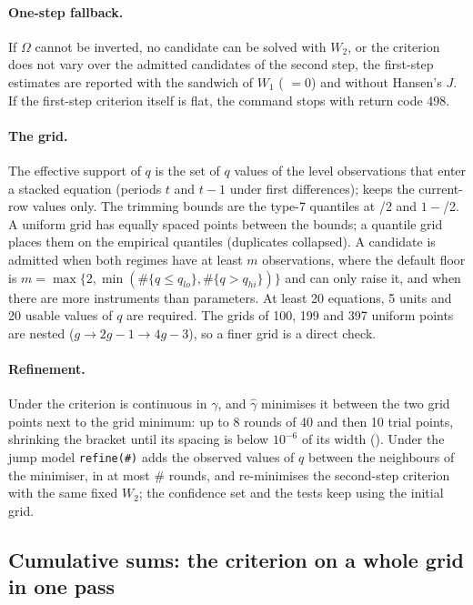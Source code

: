 \documentclass[
  10.5pt,
  a4paper,
]{article}
\begin{document}
\paragraph{One-step fallback.} If $\Omega$ cannot be inverted, no candidate can be solved with $W_2$,
or the criterion does not vary over the admitted candidates of the second step, the first-step
estimates are reported with the sandwich of $W_1$ ( $=0$) and without
Hansen's $J$. If the first-step criterion itself is flat, the command stops with return code 498.

\paragraph{The grid.} The effective support of $q$ is the set of $q$ values of the level observations
that enter a stacked equation (periods $t$ and $t-1$ under first differences); 
keeps the current-row values only. The trimming bounds are the type-7 quantiles at
/2 and $1-$/2. A uniform grid has equally spaced points between the bounds;
a quantile grid places them on the empirical quantiles (duplicates collapsed). A candidate is
admitted when both regimes have at least $m$ observations, where the default floor is
$m=\max\{2,\min(\#\{q\le q_{lo}\},\#\{q>q_{hi}\})\}$ and  can only raise it, and when
there are more instruments than parameters. At least 20 equations, 5 units and 20 usable values of
$q$ are required. The grids of 100, 199 and 397 uniform points are nested ($g\to2g-1\to4g-3$), so
a finer grid is a direct check.

\paragraph{Refinement.} Under  the criterion is continuous in $\gamma$, and $\hat\gamma$
minimises it between the two grid points next to the grid minimum: up to 8 rounds of 40 and then 10
trial points, shrinking the bracket until its spacing is below $10^{-6}$ of its width
(). Under the jump model \texttt{refine(\#)} adds the observed values of $q$
between the neighbours of the minimiser, in at most \# rounds, and re-minimises the second-step
criterion with the same fixed $W_2$; the confidence set and the tests keep using the initial grid.

\subsection{Cumulative sums: the criterion on a whole grid in one pass}\label{note:cumsum}
\end{document}
